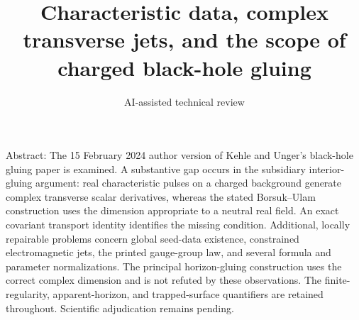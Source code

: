 \documentclass[10pt]{article}
\title{Characteristic data, complex transverse jets, and the scope of charged black-hole gluing}
\author{AI-assisted technical review}
\date{}
\begin{document}
\maketitle
Abstract: The 15 February 2024 author version of Kehle and Unger’s black-hole gluing paper is examined. A substantive gap occurs in the subsidiary interior-gluing argument: real characteristic pulses on a charged background generate complex transverse scalar derivatives, whereas the stated Borsuk–Ulam construction uses the dimension appropriate to a neutral real field. An exact covariant transport identity identifies the missing condition. Additional, locally repairable problems concern global seed-data existence, constrained electromagnetic jets, the printed gauge-group law, and several formula and parameter normalizations. The principal horizon-gluing construction uses the correct complex dimension and is not refuted by these observations. The finite-regularity, apparent-horizon, and trapped-surface quantifiers are retained throughout. Scientific adjudication remains pending.\par
\end{document}
